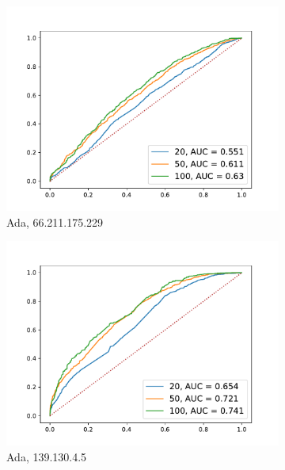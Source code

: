 \documentclass[12pt,a4paper,automark, toc=bib]{scrreprt}
\theoremstyle{definition}
\begin{document}
\begin{figure}
\begin{subfigure}{0.32\linewidth}
					\includegraphics[width=\linewidth]{figures/md5_66.211.175.229_AdaBoost.pdf}
					\caption{Ada, 66.211.175.229}
				\end{subfigure}
				\begin{subfigure}{0.32\linewidth}
					\centering
					\includegraphics[width=\linewidth]{figures/md5_139.130.4.5_AdaBoost.pdf}
					\caption{Ada, 139.130.4.5}
				\end{subfigure}
				\begin{subfigure}{0.32\linewidth}
					\centering

\end{subfigure}
\end{figure}
\end{document}
